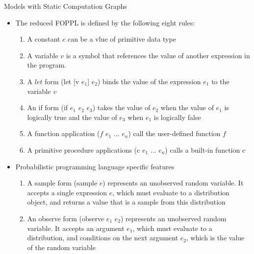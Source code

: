 \documentclass[AERbeamer%
              ,optEnglish%
              ,optBiber%
              ,optBibstyleAlphabetic%
              ,optBeamerClassicFormat%
              ]{AERlatex}%
\begin{document}
\begin{frame}[c]{Models with Static Computation Graphs}
    \centering
    \begin{itemize}
        \item The reduced FOPPL is defined by the following eight rules:
        \begin{enumerate}
            \item A constant $c$ can be a vlue of primitive data type
            \item A variable $v$ is  a symbol that references the value of another
                  expression in the program.
            \item A $let$ form (let [v $e_{1}$] $e_{2}$) binds the value of the expression
                  $e_{1}$ to the variable $v$
            \item An if form (if $e_{1}$ $e_{2}$ $e_{3}$) takes the value of $e_{2}$ when the value of
                  $e_{1}$ is logically true and the value of $e_{3}$ when $e_{1}$ is logically false
            \item A function application ($f$ $e_{1}$ ... $e_{n}$) call the user-defined function $f$
            \item A primitive procedure applications (c $e_{1}$ ... $e_{n}$) calls a built-in function c
        \end{enumerate}
        \item Probabilistic programming language specific features
        \begin{enumerate}
            \item A sample form (sample $e$) represents an unobserved random variable. It accepts a single
                  expression $e$, which must evaluate to a distribution object, and returns a value that
                  is a sample from this distribution
            \item An observe form (observe $e_{1}$ $e_{2}$) represents an unobserved random variable. It accepts
                  an argument $e_{1}$, which must evaluate to a distribution, and conditions on the next argument $e_{2}$,
                  which is the value of the random variable
        \end{enumerate}
    \end{itemize}
\end{frame}
\end{document}
